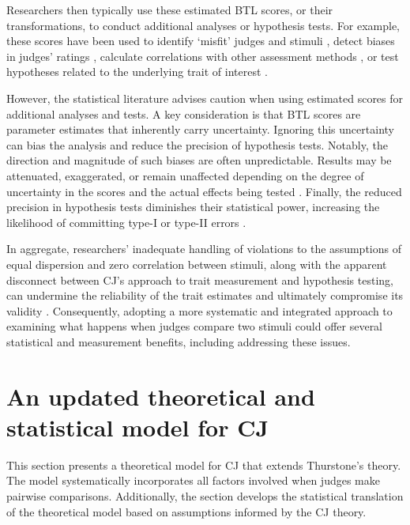 \documentclass[
  authoryear,
  preprint,
  1p]{elsarticle}
\begin{document}
Researchers then typically use these estimated BTL scores, or their
transformations, to conduct additional analyses or hypothesis tests. For
example, these scores have been used to identify `misfit' judges and
stimuli \citep{Pollitt_2012b, vanDaal_et_al_2016, Goossens_et_al_2018},
detect biases in judges' ratings
\citep{Pollitt_et_al_2003, Pollitt_2012b}, calculate correlations with
other assessment methods \citep{Goossens_et_al_2018, Bouwer_et_al_2023},
or test hypotheses related to the underlying trait of interest
\citep{Bramley_et_al_2019, Boonen_et_al_2020, Bouwer_et_al_2023, vanDaal_et_al_2017, Jones_et_al_2019, Gijsen_et_al_2021}.

However, the statistical literature advises caution when using estimated
scores for additional analyses and tests. A key consideration is that
BTL scores are parameter estimates that inherently carry uncertainty.
Ignoring this uncertainty can bias the analysis and reduce the precision
of hypothesis tests. Notably, the direction and magnitude of such biases
are often unpredictable. Results may be attenuated, exaggerated, or
remain unaffected depending on the degree of uncertainty in the scores
and the actual effects being tested
\citetext{\citealp[pp.~25]{Kline_et_al_2023}; \citealp[pp.~137]{Hoyle_et_al_2023}}.
Finally, the reduced precision in hypothesis tests diminishes their
statistical power, increasing the likelihood of committing type-I or
type-II errors \citep{McElreath_2020}.

{In aggregate, researchers' inadequate handling of violations to the
assumptions of equal dispersion and zero correlation between stimuli,
along with the apparent disconnect between CJ's approach to trait
measurement and hypothesis testing, can undermine the reliability of the
trait estimates and ultimately compromise its validity
\citep[pp.~2]{Perron_et_al_2015}. Consequently, adopting a more
systematic and integrated approach to examining what happens when judges
compare two stimuli could offer several statistical and measurement
benefits, including addressing these issues.}

\section{An updated theoretical and statistical model for
CJ}\label{sec-theory}

This section presents a theoretical model for CJ that extends
Thurstone's theory. The model systematically incorporates all factors
involved when judges make pairwise comparisons. Additionally, the
section develops the statistical translation of the theoretical model
based on assumptions informed by the CJ theory.
\end{document}

